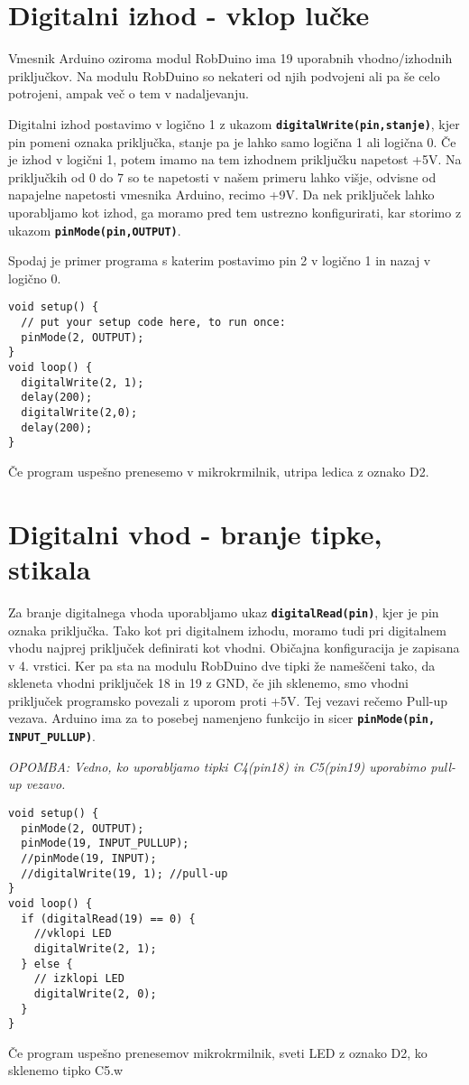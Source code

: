\documentclass[11pt,a4paper]{article}
\begin{document}
\section{Digitalni izhod - vklop lučke}
Vmesnik Arduino oziroma modul RobDuino ima 19 uporabnih vhodno/izhodnih priključkov. Na modulu RobDuino so nekateri od njih podvojeni ali pa še celo potrojeni, ampak več o tem v nadaljevanju.

Digitalni izhod postavimo v logično 1 z ukazom \texttt{\textbf{digitalWrite(pin,stanje)}}, kjer pin pomeni oznaka priključka, stanje pa je lahko samo logična 1 ali logična 0. Če je izhod v logični 1, potem imamo na tem izhodnem priključku napetost +5V. Na priključkih od 0 do 7 so te napetosti v našem primeru lahko višje, odvisne od napajelne napetosti vmesnika Arduino, recimo +9V. Da nek priključek lahko uporabljamo kot izhod, ga moramo pred tem ustrezno konfigurirati, kar storimo z ukazom \texttt{\textbf{pinMode(pin,OUTPUT)}}.

Spodaj je primer programa s katerim postavimo pin 2 v logično 1 in nazaj v logično 0. 


\begin{lstlisting}
void setup() {
  // put your setup code here, to run once:
  pinMode(2, OUTPUT);
}
void loop() {
  digitalWrite(2, 1);
  delay(200);
  digitalWrite(2,0);
  delay(200);
}
\end{lstlisting}

Če program uspešno prenesemo v mikrokrmilnik, utripa ledica z oznako D2. 


\section{Digitalni vhod - branje tipke, stikala}
Za branje digitalnega vhoda uporabljamo ukaz \texttt{\textbf{digitalRead(pin)}}, kjer je pin oznaka priključka. Tako kot pri digitalnem izhodu, moramo tudi pri digitalnem vhodu najprej priključek definirati kot vhodni. Običajna konfiguracija je zapisana v 4. vrstici. Ker pa sta na modulu RobDuino dve tipki že nameščeni tako, da skleneta vhodni priključek 18 in 19 z GND, če jih sklenemo, smo vhodni priključek programsko povezali z uporom proti +5V. Tej vezavi rečemo Pull-up vezava. Arduino ima za to posebej namenjeno funkcijo in sicer \texttt{\textbf{pinMode(pin, INPUT\_PULLUP)}}.

\textit{OPOMBA: Vedno, ko uporabljamo tipki C4(pin18) in C5(pin19) uporabimo pull-up vezavo.}

\begin{lstlisting}
void setup() {
  pinMode(2, OUTPUT);
  pinMode(19, INPUT_PULLUP);
  //pinMode(19, INPUT);
  //digitalWrite(19, 1); //pull-up
}
void loop() {  
  if (digitalRead(19) == 0) {
    //vklopi LED
    digitalWrite(2, 1);
  } else {
    // izklopi LED
    digitalWrite(2, 0);
  } 
}
\end{lstlisting}
Če program uspešno prenesemov  mikrokrmilnik, sveti LED z oznako D2, ko sklenemo tipko C5.w
\end{document}
